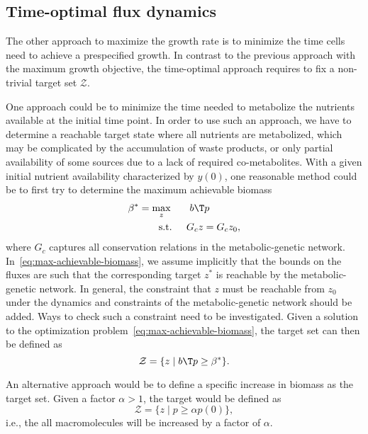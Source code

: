 \documentclass[a4paper,11pt,DIV12]{scrartcl}
\theoremstyle{remark}
\begin{document}
\subsection{Time-optimal flux dynamics}
\label{sec:time-optimal-flux}

The other approach to maximize the growth rate is to minimize the time cells need to achieve a prespecified growth.
In contrast to the previous approach with the maximum growth objective, the time-optimal approach requires to fix a non-trivial target set $\mathcal Z$.

One approach could be to minimize the time needed to metabolize the nutrients available at the initial time point.
In order to use such an approach, we have to determine a reachable target state where all nutrients are metabolized, which may be complicated by the accumulation of waste products, or only partial availability of some sources due to a lack of required co-metabolites.
With a given initial nutrient availability characterized by $y(0)$, one reasonable method could be to first try to determine the maximum achievable biomass
\begin{equation}
  \label{eq:max-achievable-biomass}
  \begin{aligned}
    \beta^\ast &= \max_{z} &&\ b\T p \\
    &\qquad\textnormal{s.t. } && G_c z = G_c z_0,
  \end{aligned}
\end{equation}
where $G_c$ captures all conservation relations in the metabolic-genetic network.
In~\eqref{eq:max-achievable-biomass}, we assume implicitly that the bounds on the fluxes are such that the corresponding target $z^\ast$ is reachable by the metabolic-genetic network.
In general, the constraint that $z$ must be reachable from $z_0$ under the dynamics and constraints of the metabolic-genetic network should be added.
Ways to check such a constraint need to be investigated.
Given a solution to the optimization problem~\eqref{eq:max-achievable-biomass}, the target set can then be defined as
\begin{equation}
  \label{eq:time-optimal-targetset1}
  \mathcal Z = \{ z \mid b\T p \geq \beta^\ast \}.
\end{equation}

An alternative approach would be to define a specific increase in biomass as the target set.
Given a factor $\alpha > 1$, the target would be defined as
\begin{equation}
  \label{eq:time-optimal-targetset2}
  \mathcal Z = \{ z \mid p \geq \alpha p(0) \},
\end{equation}
i.e., the all macromolecules will be increased by a factor of $\alpha$.
\end{document}
